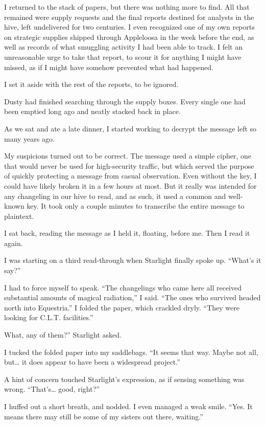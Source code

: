 I returned to the stack of papers, but there was nothing more to find. All that remained were supply requests and the final reports destined for analysts in the hive, left undelivered for two centuries. I even recognized one of my own reports on strategic supplies shipped through Appleloosa in the week before the end, as well as records of what smuggling activity I had been able to track. I felt an unreasonable urge to take that report, to scour it for anything I might have missed, as if I might have somehow prevented what had happened.

I set it aside with the rest of the reports, to be ignored.

Dusty had finished searching through the supply boxes. Every single one had been emptied long ago and neatly stacked back in place.

As we sat and ate a late dinner, I started working to decrypt the message left so many years ago.

My suspicions turned out to be correct. The message used a simple cipher, one that would never be used for high-security traffic, but which served the purpose of quickly protecting a message from casual observation. Even without the key, I could have likely broken it in a few hours at most. But it really was intended for any changeling in our hive to read, and as such, it used a common and well-known key. It took only a couple minutes to transcribe the entire message to plaintext.

I sat back, reading the message as I held it, floating, before me. Then I read it again.

I was starting on a third read-through when Starlight finally spoke up. “What’s it say?”

I had to force myself to speak. “The changelings who came here all received substantial amounts of magical radiation,” I said. “The ones who survived headed north into Equestria.” I folded the paper, which crackled dryly. “They were looking for C.L.T. facilities.”

\leavevmode{}What, any of them?” Starlight asked.

I tucked the folded paper into my saddlebags. “It seems that way. Maybe not all, but… it does appear to have been a widespread project.”

A hint of concern touched Starlight’s expression, as if sensing something was wrong. “That’s… good, right?”

I huffed out a short breath, and nodded. I even managed a weak smile. “Yes. It means there may still be some of my sisters out there, waiting.”

